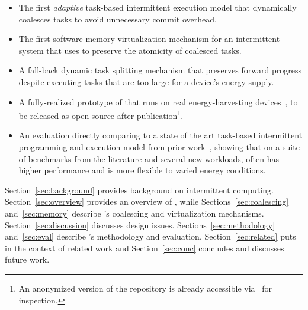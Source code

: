 \begin{itemize}
\item The first {\em adaptive} task-based intermittent execution model that dynamically coalesces tasks to avoid unnecessary commit overhead. 
\item The first software memory virtualization mechanism for an intermittent system that \sys uses to preserve the atomicity of coalesced tasks.
\item A fall-back dynamic task splitting mechanism that preserves forward progress despite executing tasks that are too large for a device's energy supply.
\item A fully-realized prototype of \sys that runs on real energy-harvesting devices~\cite{wisp,capybara}, to be released as open source after publication\footnote{An anonymized version of the \sys repository is already accessible via~\cite{coala_website} for inspection.}. 
\item An evaluation directly comparing \sys to a state of the art task-based intermittent programming and execution model from prior work~\cite{alpaca}, showing that on a suite of benchmarks from the literature and several new workloads, \sys often has higher performance and is more flexible to varied energy conditions. 
\end{itemize}

Section~\ref{sec:background} provides background on intermittent computing.
Section~\ref{sec:overview} provides an overview of \sys, while
Sections~\ref{sec:coalescing} and~\ref{sec:memory} describe \sys's coalescing
and virtualization mechanisms. Section~\ref{sec:discussion} discusses \sys
design issues. Sections~\ref{sec:methodology} and~\ref{sec:eval} describe
\sys's methodology and evaluation. Section~\ref{sec:related} puts \sys in the
context of related work and Section~\ref{sec:conc} concludes and discusses
future work.
